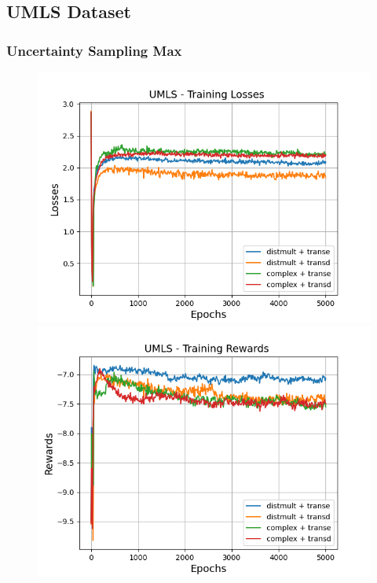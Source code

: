 \subsection{UMLS Dataset}

\subsubsection{Uncertainty Sampling Max}

\begin{figure}
    \centering
    \begin{minipage}{.5\textwidth}
      \centering
      \includegraphics[width=0.9\linewidth]{figures/results/gan_train/not_pretrained/uncertainty/max/entropy/umls/gan_train_uncertainty_umls_losses.png}
    \end{minipage}%
    \begin{minipage}{.5\textwidth}
      \centering
      \includegraphics[width=0.9\linewidth]{figures/results/gan_train/not_pretrained/uncertainty/max/entropy/umls/gan_train_uncertainty_umls_rewards.png}

\end{minipage}
\end{figure}
